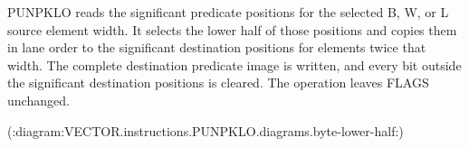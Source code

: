PUNPKLO reads the significant predicate positions for the selected B, W, or L
source element width.  It selects the lower half of those positions and copies
them in lane order to the significant destination positions for elements twice
that width.  The complete destination predicate image is written, and every bit
outside the significant destination positions is cleared.  The operation leaves FLAGS
unchanged.

(:diagram:VECTOR.instructions.PUNPKLO.diagrams.byte-lower-half:)

